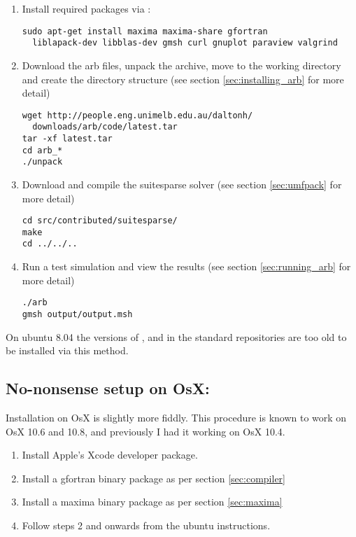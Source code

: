 \begin{enumerate}
\item Install required packages via :
\begin{verbatim}
sudo apt-get install maxima maxima-share gfortran
  liblapack-dev libblas-dev gmsh curl gnuplot paraview valgrind
\end{verbatim}
\item Download the arb files, unpack the archive, move to the working directory and create the directory structure (see section \ref{sec:installing_arb} for more detail)
\begin{verbatim}
wget http://people.eng.unimelb.edu.au/daltonh/
  downloads/arb/code/latest.tar
tar -xf latest.tar
cd arb_*
./unpack
\end{verbatim}
\item Download and compile the suitesparse solver (see section \ref{sec:umfpack} for more detail)
\begin{verbatim}
cd src/contributed/suitesparse/
make
cd ../../..
\end{verbatim}
\item Run a test simulation and view the results (see section \ref{sec:running_arb} for more detail)
\begin{verbatim}
./arb
gmsh output/output.msh
\end{verbatim}
\end{enumerate}

On ubuntu 8.04 the versions of ,  and  in the standard repositories are too old to be installed via this method.

\subsection{No-nonsense setup on OsX:}

Installation on OsX is slightly more fiddly.  This procedure is known to work on OsX 10.6 and 10.8, and previously I had it working on OsX 10.4.

\begin{enumerate}
\item Install Apple's Xcode developer package.
\item Install a gfortran binary package as per section \ref{sec:compiler}
\item Install a maxima binary package as per section \ref{sec:maxima}
\item Follow steps 2 and onwards from the ubuntu instructions.
\end{enumerate}

